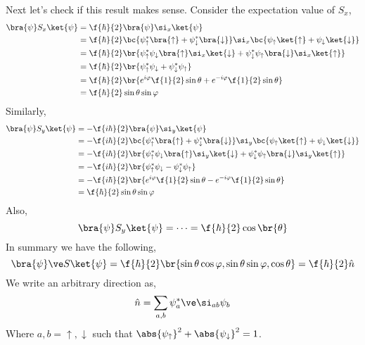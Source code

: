 \documentclass{article}
\begin{document}
Next let's check if this result makes sense. Consider the expectation value of $S_x$,
\begin{align*}
    \bra{\psi} S_x \ket{\psi}
    &= \f{\hbar}{2} \bra{\psi} \si_x \ket{\psi} \\
    &= \f{\hbar}{2} \bc{\psi_\uparrow^* \bra{\uparrow} + \psi^*_{\downarrow} \bra{\downarrow}} \si_x \bc{\psi_\uparrow \ket{\uparrow} + \psi_{\downarrow} \ket{\downarrow}} \\
    &= \f{\hbar}{2} \br{\psi_\uparrow^* \psi_\downarrow \bra{\uparrow} \si_x \ket{\downarrow} + \psi_\downarrow^* \psi_\uparrow \bra{\downarrow} \si_x \ket{\uparrow}} \\
    &= \f{\hbar}{2} \br{\psi_\uparrow^* \psi_\downarrow + \psi_\downarrow^* \psi_\uparrow} \\
    &= \f{\hbar}{2} \br{e^{i\varphi} \f{1}{2} \sin \theta + e^{-i\varphi} \f{1}{2} \sin \theta} \\
    &= \f{\hbar}{2} \sin \theta \sin \varphi \\
\end{align*}
Similarly,
\begin{align*}
    \bra{\psi} S_y \ket{\psi}
    &= -\f{i\hbar}{2} \bra{\psi} \si_y \ket{\psi} \\
    &= -\f{i\hbar}{2} \bc{\psi_\uparrow^* \bra{\uparrow} + \psi^*_{\downarrow} \bra{\downarrow}} \si_y \bc{\psi_\uparrow \ket{\uparrow} + \psi_{\downarrow} \ket{\downarrow}} \\
    &= -\f{i\hbar}{2} \br{\psi_\uparrow^* \psi_\downarrow \bra{\uparrow} \si_y \ket{\downarrow} + \psi_\downarrow^* \psi_\uparrow \bra{\downarrow} \si_y \ket{\uparrow}} \\
    &= -\f{i\hbar}{2} \br{\psi_\uparrow^* \psi_\downarrow - \psi_\downarrow^* \psi_\uparrow} \\
    &= -\f{i\hbar}{2} \br{e^{i\varphi} \f{1}{2} \sin \theta - e^{-i\varphi} \f{1}{2} \sin \theta} \\
    &= \f{\hbar}{2} \sin \theta \sin \varphi \\
\end{align*}
Also,
\[ \bra{\psi} S_y \ket{\psi} = \cdots = \f{\hbar}{2}\cos\br{\theta} \]
In summary we have the following,
\[ \bra{\psi} \ve S \ket{\psi} = \f{\hbar}{2} \br{\sin \theta \cos \varphi, \sin \theta \sin \varphi, \cos \theta} = \f{\hbar}{2}\hat{n} \]
We write an arbitrary direction as,
\[ \hat{n} = \sum_{a,b} \psi^*_{a} \ve \si_{ab} \psi_b \]
Where $a,b = \uparrow, \downarrow$ such that $\abs{\psi_{\uparrow}}^2 + \abs{\psi_{\downarrow}}^2 = 1$.
\end{document}
